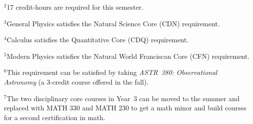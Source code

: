 \documentclass[12pt]{article}
\begin{document}
\hspace{0.1in}$^{2}$17 credit-hours are required for this semester.

\hspace{0.1in}$^{3}$General Physics satisfies the Natural Science Core (CDN) requirement.

\hspace{0.1in}$^{4}$Calculus satisfies the Quantitative Core (CDQ) requirement.

\hspace{0.1in}$^{5}$Modern Physics satisfies the Natural World Franciscan Core
(CFN) requirement.

\hspace{0.1in}$^{6}$This requirement can be satisfied by taking {\em ASTR~380:
  Observational Astronomy} (a 3-credit \hspace*{0.42in}course offered in the
fall).

\hspace{0.1in}$^{7}$The two disciplinary core courses in Year~3 can be moved to
the summer and replaced with \hspace*{0.42in}MATH 330 and MATH 230 to get a math
minor and build courses for a second certification \hspace*{0.42in}in math.
\end{document}
